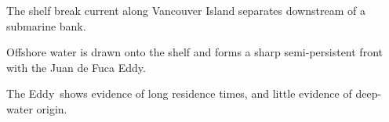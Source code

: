 \documentclass[draft]{agujournal2019}
\newcommand*{\Eddy}{{\sc Eddy}}
\begin{document}

\begin{keypoints}
\item The shelf break current along Vancouver Island separates downstream of a submarine bank.
\item Offshore water is drawn onto the shelf and forms a sharp semi-persistent front with the Juan de Fuca Eddy.
\item The \Eddy\ shows evidence of long residence times, and little evidence of deep-water origin.
\end{keypoints}
\end{document}
